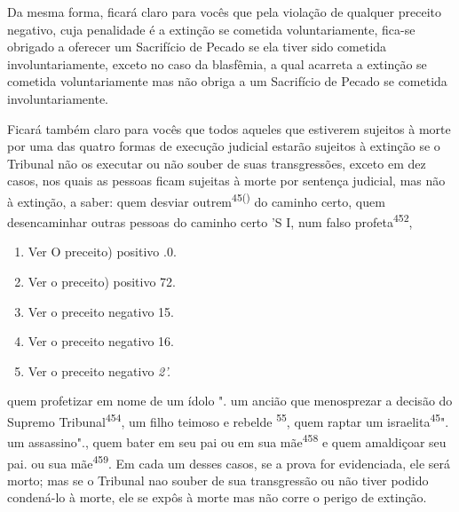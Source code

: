 \begin{itemize}
\begin{enumrate}
\begin{itemize}
\begin{itemize}
\begin{itemize}
Da mesma forma, ficará claro para vocês que pela violação de qual­quer
preceito negativo, cuja penalidade é a extinção se cometida
voluntaria­mente, fica-se obrigado a oferecer um Sacrifício de Pecado se
ela tiver sido co­metida involuntariamente, exceto no caso da blasfêmia,
a qual acarreta a extin­ção se cometida voluntariamente mas não obriga a
um Sacrifício de Pecado se cometida involuntariamente.

Ficará também claro para vocês que todos aqueles que estiverem su­jeitos
à morte por uma das quatro formas de execução judicial estarão sujeitos
à extinção se o Tribunal não os executar ou não souber de suas
transgressões, exceto em dez casos, nos quais as pessoas ficam sujeitas
à morte por sentença judicial, mas não à extinção, a saber: quem desviar
outrem\textsuperscript{45()} do caminho certo, quem desencaminhar outras
pessoas do caminho certo 'S I, num falso profeta\textsuperscript{452},


\begin{enumerate}
\def\labelenumi{\arabic{enumi}.}
\setcounter{enumi}{447}
\item
 
 Ver O preceito) positivo .0.
 
\item
 
 Ver o preceito) positivo 72.
 
\item
 
 Ver o preceito negativo 15.
 
\item
 
 Ver o preceito negativo 16.
 
\item
 
 Ver o preceito negativo \emph{2'.}
 
\end{enumerate}

quem profetizar em nome de um ídolo 
". um ancião que
menosprezar a deci­são do Supremo Tribunal\textsuperscript{454}, um
filho teimoso e rebelde \textsuperscript{55}, quem raptar um
israelita\textsuperscript{45}". um assassino"., quem
bater em seu pai ou em sua mãe\textsuperscript{458} e quem amaldiçoar
seu pai. ou sua mãe\textsuperscript{459}. Em cada um desses casos, se a
prova for evi­denciada, ele será morto; mas se o Tribunal nao souber de
sua transgressão ou não tiver podido condená-lo à morte, ele se expôs à
morte mas não corre o perigo de extinção.



\end{itemize}
\end{itemize}
\end{itemize}
\end{enumrate}
\end{itemize}
